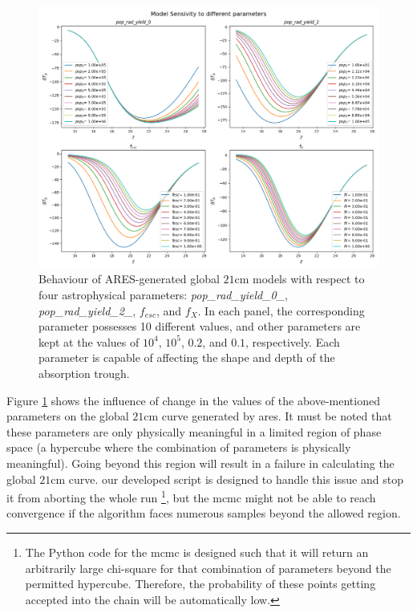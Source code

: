 \documentclass[12pt, TexShade, letterpaper]{report}
\begin{document}
\begin{figure}[h!]
\centering
\includegraphics[scale =0.5]{sensivity.png}
\caption[Behaviour of global $\mathrm{21cm}$ theoretical model with respect to underlying astrophysical parameters]{Behaviour of ARES-generated global $\mathrm{21cm}$ models with respect to four astrophysical parameters: \emph{pop\_rad\_yield\_0\_}, \emph{pop\_rad\_yield\_2\_}, $f_{esc}$, and $f_X$. In each panel, the corresponding parameter possesses 10 different values, and other parameters are kept at the values of  $10^4$, $10^5$, $0.2$, and $0.1$, respectively. Each parameter is capable of affecting the shape and depth of the absorption trough.}
\label{fig:sensivity}
\end{figure}

Figure \ref{fig:sensivity} shows the influence of change in the values of the above-mentioned parameters on the global $\mathrm{21cm}$ curve generated by \gls{ares}. It must be noted that these parameters are only physically meaningful in a limited region of phase space (a hypercube where the combination of parameters is physically meaningful). Going beyond this region will result in a failure in calculating the global $\mathrm{21cm}$ curve. our developed script is designed to handle this issue and stop it from aborting the whole run \footnote{The Python code for the \gls{mcmc} is designed such that it will return an arbitrarily large chi-square for that combination of parameters beyond the permitted hypercube. Therefore, the probability of these points getting accepted into the chain will be automatically low.}, but the \gls{mcmc} might not be able to reach convergence if the algorithm faces numerous samples beyond the allowed region.\par
\end{document}
